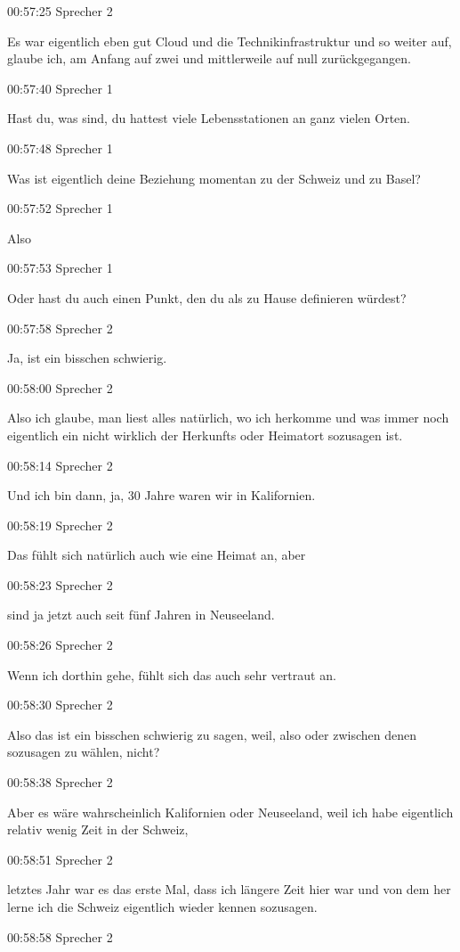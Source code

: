 00:57:25 Sprecher 2

Es war eigentlich eben gut Cloud und die Technikinfrastruktur und so
weiter auf, glaube ich, am Anfang auf zwei und mittlerweile auf null
zurückgegangen.

00:57:40 Sprecher 1

Hast du, was sind, du hattest viele Lebensstationen an ganz vielen
Orten.

00:57:48 Sprecher 1

Was ist eigentlich deine Beziehung momentan zu der Schweiz und zu Basel?

00:57:52 Sprecher 1

Also

00:57:53 Sprecher 1

Oder hast du auch einen Punkt, den du als zu Hause definieren würdest?

00:57:58 Sprecher 2

Ja, ist ein bisschen schwierig.

00:58:00 Sprecher 2

Also ich glaube, man liest alles natürlich, wo ich herkomme und was
immer noch eigentlich ein nicht wirklich der Herkunfts oder Heimatort
sozusagen ist.

00:58:14 Sprecher 2

Und ich bin dann, ja, 30 Jahre waren wir in Kalifornien.

00:58:19 Sprecher 2

Das fühlt sich natürlich auch wie eine Heimat an, aber

00:58:23 Sprecher 2

sind ja jetzt auch seit fünf Jahren in Neuseeland.

00:58:26 Sprecher 2

Wenn ich dorthin gehe, fühlt sich das auch sehr vertraut an.

00:58:30 Sprecher 2

Also das ist ein bisschen schwierig zu sagen, weil, also oder zwischen
denen sozusagen zu wählen, nicht?

00:58:38 Sprecher 2

Aber es wäre wahrscheinlich Kalifornien oder Neuseeland, weil ich habe
eigentlich relativ wenig Zeit in der Schweiz,

00:58:51 Sprecher 2

letztes Jahr war es das erste Mal, dass ich längere Zeit hier war und
von dem her lerne ich die Schweiz eigentlich wieder kennen sozusagen.

00:58:58 Sprecher 2

